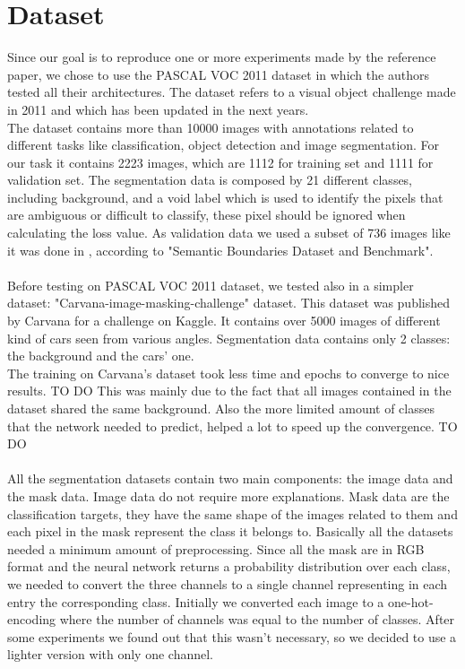 \documentclass[10pt,twocolumn,letterpaper]{article}
\begin{document}
\section{Dataset}

Since our goal is to reproduce one or more experiments made by the reference paper\cite{projectPaper}, we chose to use the PASCAL VOC 2011\cite{pascal-voc-2011} dataset in which the authors tested all their architectures.
The dataset refers to a visual object challenge made in 2011 and which has been updated in the next years. \\
The dataset contains more than 10000 images with annotations related to different tasks like classification, object detection and image segmentation.
For our task it contains 2223 images, which are 1112 for training set and 1111 for validation set.
The segmentation data is composed by 21 different classes, including background, and a void label which is used to identify the pixels that are ambiguous or difficult to classify, these pixel should be ignored when calculating the loss value.
As validation data we used a subset of 736 images like it was done in \cite{projectPaper}, according to "Semantic Boundaries Dataset and Benchmark"\cite{BharathICCV2011}. \\ \\
Before testing on PASCAL VOC 2011 dataset, we tested also in a simpler dataset: "Carvana-image-masking-challenge"\cite{carvana} dataset. This dataset was published by Carvana for a challenge on Kaggle. It contains over 5000 images of different kind of cars seen from various angles. Segmentation data contains only 2 classes: the background and the cars' one. \\
The training on Carvana's dataset took less time and epochs to converge to nice results. TO DO
This was mainly due to the fact that all images contained in the dataset shared the same background. Also the more limited amount of classes that the network needed to predict, helped a lot to speed up the convergence. TO DO \\ \\
All the segmentation datasets contain two main components: the image data and the mask data. Image data do not require more explanations. Mask data are the classification targets, they have the same shape of the images related to them and each pixel in the mask represent the class it belongs to.
Basically all the datasets needed a minimum amount of preprocessing.
Since all the mask are in RGB format and the neural network returns a probability distribution over each class, we needed to convert the three channels to a single channel representing in each entry the corresponding class. Initially we converted each image to a one-hot-encoding where the number of channels was equal to the number of classes. After some experiments we found out that this wasn't necessary, so we decided to use a lighter version with only one channel. \\
\end{document}
